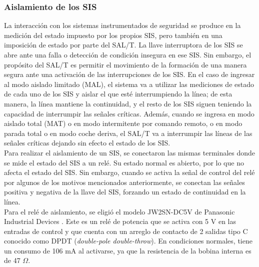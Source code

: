 \subsubsection{Aislamiento de los SIS}




La interacción con los sistemas instrumentados de seguridad se produce en la medición del estado impuesto por los propios SIS, pero también en una imposición de estado por parte del SAL/T. La llave interruptora de los SIS se abre ante una falla o detección de condición insegura en ese SIS. Sin embargo, el propósito del SAL/T es permitir el movimiento de la formación de una manera segura ante una activación de las interrupciones de los SIS. En el caso de ingresar al modo aislado limitado (MAL), el sistema va a utilizar las mediciones de estado de cada uno de los SIS y aislar el que esté interrumpiendo la línea; de esta manera, la línea mantiene la continuidad, y el resto de los SIS siguen teniendo la capacidad de interrumpir las señales críticas. Además, cuando se ingresa en modo aislado total (MAT) o en modo intermitente por comando remoto, o en modo parada total o en modo coche deriva, el SAL/T va a interrumpir las líneas de las señales críticas dejando sin efecto el estado de los SIS. \\    

Para realizar el aislamiento de un SIS, se conectaron las mismas terminales donde se mide el estado del SIS a un relé. Su estado normal es abierto, por lo que no afecta el estado del SIS. Sin embargo, cuando se activa la señal de control del relé por algunos de los motivos mencionados anteriormente, se conectan las señales positiva y negativa de la llave del SIS, forzando un estado de continuidad en la línea. \\ 

Para el relé de aislamiento, se eligió el modelo JW2SN-DC5V de Panasonic Industrial Devices \cite{JW2SN-DC5V}. Este es un relé de potencia que se activa con 5 V en las entradas de control y que cuenta con un arreglo de contacto de 2 salidas tipo C conocido como DPDT (\textit{double-pole double-throw}). En condiciones normales, tiene un consumo de 106 mA al activarse, ya que la resistencia de la bobina interna es de 47 $\Omega$. \\

